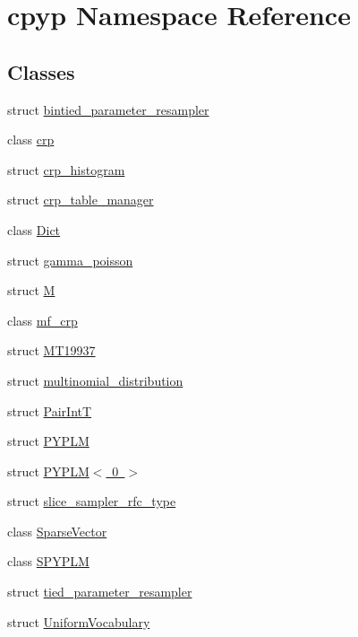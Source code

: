 \hypertarget{namespacecpyp}{}\section{cpyp Namespace Reference}
\label{namespacecpyp}
\subsection*{Classes}
\begin{DoxyCompactItemize}
\item 
struct \mbox{\hyperlink{structcpyp_1_1bintied__parameter__resampler}{bintied\+\_\+parameter\+\_\+resampler}}
\item 
class \mbox{\hyperlink{classcpyp_1_1crp}{crp}}
\item 
struct \mbox{\hyperlink{structcpyp_1_1crp__histogram}{crp\+\_\+histogram}}
\item 
struct \mbox{\hyperlink{structcpyp_1_1crp__table__manager}{crp\+\_\+table\+\_\+manager}}
\item 
class \mbox{\hyperlink{classcpyp_1_1_dict}{Dict}}
\item 
struct \mbox{\hyperlink{structcpyp_1_1gamma__poisson}{gamma\+\_\+poisson}}
\item 
struct \mbox{\hyperlink{structcpyp_1_1_m}{M}}
\item 
class \mbox{\hyperlink{classcpyp_1_1mf__crp}{mf\+\_\+crp}}
\item 
struct \mbox{\hyperlink{structcpyp_1_1_m_t19937}{M\+T19937}}
\item 
struct \mbox{\hyperlink{structcpyp_1_1multinomial__distribution}{multinomial\+\_\+distribution}}
\item 
struct \mbox{\hyperlink{structcpyp_1_1_pair_int_t}{Pair\+IntT}}
\item 
struct \mbox{\hyperlink{structcpyp_1_1_p_y_p_l_m}{P\+Y\+P\+LM}}
\item 
struct \mbox{\hyperlink{structcpyp_1_1_p_y_p_l_m_3_010_01_4}{P\+Y\+P\+L\+M$<$ 0 $>$}}
\item 
struct \mbox{\hyperlink{structcpyp_1_1slice__sampler__rfc__type}{slice\+\_\+sampler\+\_\+rfc\+\_\+type}}
\item 
class \mbox{\hyperlink{classcpyp_1_1_sparse_vector}{Sparse\+Vector}}
\item 
class \mbox{\hyperlink{classcpyp_1_1_s_p_y_p_l_m}{S\+P\+Y\+P\+LM}}
\item 
struct \mbox{\hyperlink{structcpyp_1_1tied__parameter__resampler}{tied\+\_\+parameter\+\_\+resampler}}
\item 
struct \mbox{\hyperlink{structcpyp_1_1_uniform_vocabulary}{Uniform\+Vocabulary}}
\end{DoxyCompactItemize}
